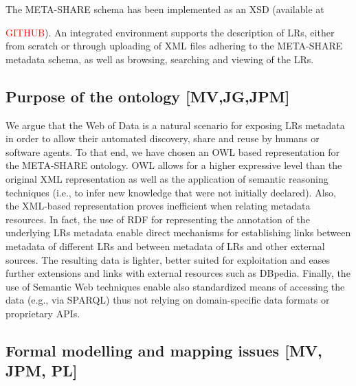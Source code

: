 \documentclass{llncs}
\begin{document}
The META-SHARE schema has been implemented as an XSD (available at {\textcolor{red}{GITHUB}). An integrated environment supports the description of LRs, either from scratch or through uploading of XML files adhering to the META-SHARE metadata schema, as well as browsing, searching and viewing of the LRs.

\subsection{Purpose of the ontology [MV,JG,JPM]}
\label{sec:purpose}

We argue that the Web of Data is a natural scenario for exposing LRs metadata in order to allow their automated discovery, share and reuse by humans or software agents. To that end, we have chosen an OWL based representation for the META-SHARE ontology. 
OWL allows for a higher expressive level than the original XML representation as well as the application of semantic reasoning techniques (i.e., to infer new knowledge that were not initially declared). Also, the XML-based representation proves inefficient when relating metadata resources. In fact, the use of RDF for representing the annotation of the underlying LRs metadata enable direct mechanisms for establishing links between metadata of different LRs and between metadata of LRs and other external sources.
The resulting data is lighter, better suited for exploitation and eases further extensions and links with external resources such as DBpedia.
Finally, the use of Semantic Web techniques enable also standardized means of accessing the data (e.g., via SPARQL) thus not relying on domain-specific data formats or proprietary APIs.



\subsection{Formal modelling and mapping issues [MV, JPM, PL]}

}
\end{document}
